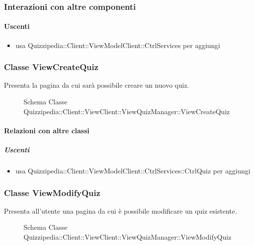 \subsubsection{Interazioni con altre componenti}
\paragraph{Uscenti}
\begin{itemize}
\item usa Quizzipedia::Client::ViewModelClient::CtrlServices per aggiungi
\end{itemize}
\subsubsection{Classe ViewCreateQuiz}
Presenta la pagina da cui sarà possibile creare un nuovo quiz.
\begin{figure}[H]
\centering
\noindent{}
\caption[Schema Classe ViewCreateQuiz]{Schema Classe Quizzipedia::Client::ViewClient::ViewQuizManager::ViewCreateQuiz}
\end{figure}
\paragraph{Relazioni con altre classi}
\subparagraph{Uscenti}
\begin{itemize}
\item usa Quizzipedia::Client::ViewModelClient::CtrlServices::CtrlQuiz per aggiungi
\end{itemize}
\subsubsection{Classe ViewModifyQuiz}
Presenta all'utente una pagina da cui è possibile modificare un quiz esistente.
\begin{figure}[H]
\centering
\noindent{}
\caption[Schema Classe ViewModifyQuiz]{Schema Classe Quizzipedia::Client::ViewClient::ViewQuizManager::ViewModifyQuiz}
\end{figure}
